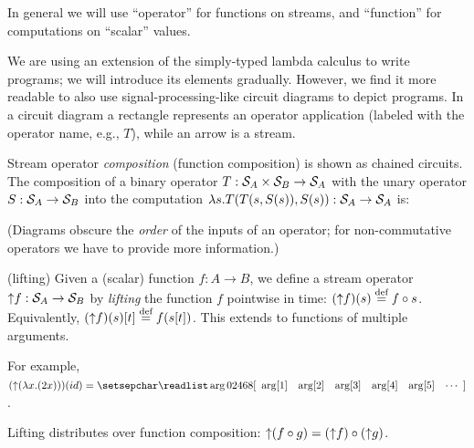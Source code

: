 In general we will use ``operator'' for functions on streams, and
``function'' for computations on ``scalar'' values.

We are using an extension of the simply-typed lambda calculus to write \dbsp programs;
we will introduce its elements gradually.  However, we find it more readable to
also use signal-processing-like circuit diagrams to depict \dbsp programs.
In a circuit diagram a rectangle represents an operator application (labeled
with the operator name, e.g., $T$), while an arrow is a stream.  

Stream operator \emph{composition} (function composition) is shown as chained circuits.
The composition of a binary operator $T: \mathcal{S}_{A} \times \mathcal{S}_{B} \to \mathcal{S}_{A}$ with the 
unary operator $S: \mathcal{S}_{A} \to \mathcal{S}_{B}$ into the computation 
$\lambda s. T(T(s,S(s)),S(s)) : \mathcal{S}_{A}\to\mathcal{S}_{A}$ 
is:

\begin{center}
\end{center}

(Diagrams obscure the \emph{order} of the inputs of an operator; for non-commutative
operators we have to provide more information.)  

\begin{definition}(lifting)
Given a (scalar) function $f: A \to B$,
we define a stream operator ${\uparrow}f :\mathcal{S}_{A} \to \mathcal{S}_{B}$ 
by \emph{lifting} the function $f$ pointwise in time: $({\uparrow}f)(s) \stackrel{\textrm{\scriptsize def}}{=} f \circ s$.
Equivalently, $({\uparrow}f)(s)[t] \stackrel{\textrm{\scriptsize def}}{=} f(s[t])$.
This extends to functions of multiple arguments.
\end{definition}

\ifstreamexamples
For example, $(\lift{(\lambda x.(2x))})(id) = \sv{0 2 4 6 8}$.
\fi

\begin{proposition}[distributivity]\label{prop:distributivity}
Lifting distributes over function composition:
${\uparrow}(f \circ g) = ({\uparrow}f) \circ ({\uparrow}g)$.
\end{proposition}

